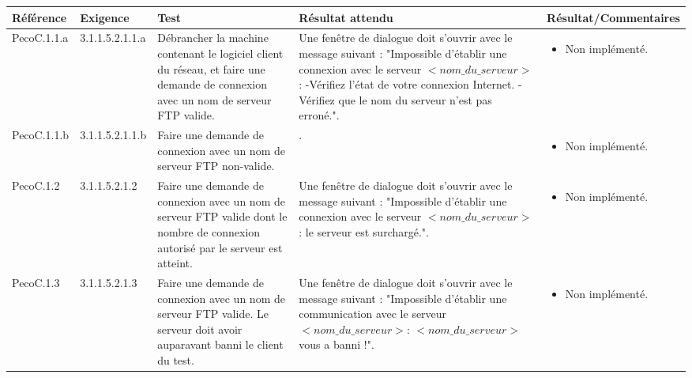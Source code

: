 \documentclass[10pt,a4paper,landscape]{report}
\begin{document}
\begin{center}
	\bgroup
	\def\arraystretch{1.5}
	\begin{tabular}{|p{2.5cm}|p{2cm}|p{8cm}|p{8cm}|p{5cm}|}
		\hline
		\rowcolor{gris}Référence & Exigence & Test & Résultat attendu & Résultat/Commentaires\\
		\hline
		PecoC.1.1.a & 3.1.1.5.2.1.1.a & Débrancher la machine contenant le logiciel client du réseau, et faire une demande de connexion avec un nom de serveur FTP valide.& Une fenêtre de dialogue doit s'ouvrir avec le message suivant :   "Impossible d'établir une connexion avec le serveur $< nom\_du\_serveur>$:\linebreak
-Vérifiez l'état de votre connexion Internet.\linebreak
-Vérifiez que le nom du serveur n'est pas erroné.".&\vspace*{-0.2cm} \begin{itemize}[label=$\ast$] \item \textcolor{false}{Non implémenté.}\end{itemize} \\
		\cline{1-3}\cline{5-5}
		PecoC.1.1.b & 3.1.1.5.2.1.1.b & Faire une demande de connexion avec un nom de serveur FTP non-valide.& .&\vspace*{-0.2cm} \begin{itemize}[label=$\ast$] \item \textcolor{false}{Non implémenté.}\end{itemize}\\
		\hline
		PecoC.1.2 & 3.1.1.5.2.1.2 & Faire une demande de connexion avec un nom de serveur FTP valide dont le nombre de connexion autorisé par le serveur est atteint.& Une fenêtre de dialogue doit s'ouvrir avec le message suivant :   "Impossible d'établir une connexion avec le serveur $< nom\_du\_serveur>$: le serveur est surchargé.".&\vspace*{-0.2cm} \begin{itemize}[label=$\ast$] \item \textcolor{false}{Non implémenté.}\end{itemize}\\
		\hline
		PecoC.1.3  & 3.1.1.5.2.1.3 & Faire une demande de connexion avec un nom de serveur FTP valide. Le serveur doit avoir auparavant banni le client du test.& Une fenêtre de dialogue doit s'ouvrir avec le message suivant :   "Impossible d'établir une communication avec le serveur $< nom\_du\_serveur>$:
$< nom\_du\_serveur>$ vous a banni !".&\vspace*{-0.2cm} \begin{itemize}[label=$\ast$] \item \textcolor{false}{Non implémenté.}\end{itemize}\\

\end{tabular}
\end{center}
\end{document}
